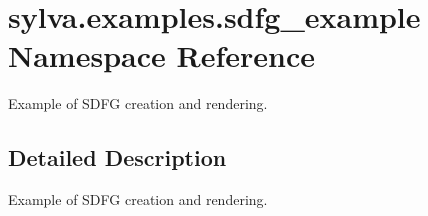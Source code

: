 \hypertarget{namespacesylva_1_1examples_1_1sdfg__example}{}\section{sylva.\+examples.\+sdfg\+\_\+example Namespace Reference}
\label{namespacesylva_1_1examples_1_1sdfg__example}


Example of S\+D\+FG creation and rendering.  




\subsection{Detailed Description}
Example of S\+D\+FG creation and rendering. 